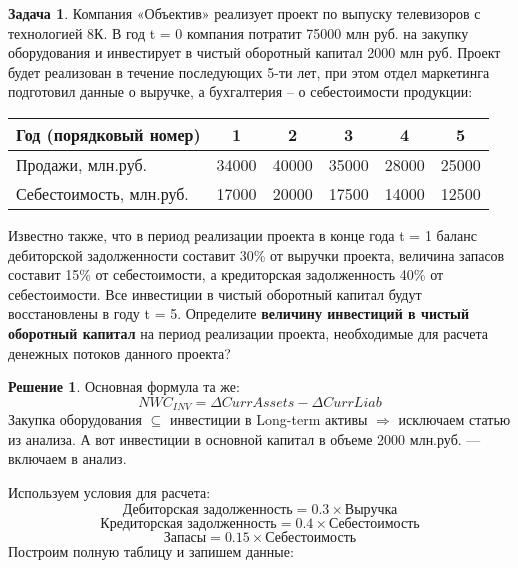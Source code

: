 \documentclass[a4paper, 14pt]{article}
\theoremstyle{plain} %
\theoremstyle{definition} %
\newtheorem*{solution}{Решение}
\newtheorem{problem}{Задача}[subsection]
\theoremstyle{remark} %
\begin{document}
\begin{problem}
    Компания «Объектив» реализует проект по выпуску телевизоров с технологией 8К. В год t = 0 компания потратит 75000 млн руб. на закупку оборудования и инвестирует в чистый  оборотный  капитал  2000  млн  руб.  Проект  будет  реализован  в  течение последующих  5-ти  лет,  при  этом  отдел  маркетинга  подготовил  данные  о  выручке,  а бухгалтерия – о себестоимости продукции:

    \vspace{0.4em}
    \begin{tabularx}{0.88\textwidth}{|X|c|c|c|c|c|}
        \hline
        \textbf{Год (порядковый номер)} & \textbf{1} & \textbf{2} & \textbf{3} & \textbf{4} & \textbf{5} \\
        \hline
        Продажи, млн.руб. & 34000 & 40000 & 35000 & 28000 & 25000 \\
        \hline
        Себестоимость, млн.руб. & 17000 & 20000 & 17500 & 14000 & 12500 \\
        \hline
    \end{tabularx}

    \vspace{0.4em}
    Известно  также,  что  в  период  реализации  проекта в  конце  года t = 1 баланс дебиторской задолженности составит 30\% от выручки проекта, величина запасов составит 15\%  от  себестоимости,  а  кредиторская  задолженность  40\%  от  себестоимости.  Все инвестиции в чистый оборотный капитал будут восстановлены в году t = 5. Определите \textbf{величину  инвестиций  в  чистый  оборотный  капитал}  на  период  реализации  проекта, необходимые для расчета денежных потоков данного проекта?

    \begin{solution}
        Основная формула та же:
        \[NWC_{INV} = \Delta CurrAssets - \Delta CurrLiab \]
        Закупка оборудования $\subseteq$ инвестиции в Long-term активы $\Longrightarrow$ исключаем статью из анализа. А вот инвестиции в основной капитал в объеме 2000 млн.руб. --- включаем в анализ.

        Используем условия для расчета:
        \[\textit{Дебиторская задолженность} = 0.3\times\textit{Выручка}\]
        \[\textit{Кредиторская задолженность} = 0.4\times\textit{Себестоимость}\]
        \[\textit{Запасы} = 0.15\times\textit{Себестоимость}\]
        Построим полную таблицу и запишем данные:


\end{solution}
\end{problem}
\end{document}
